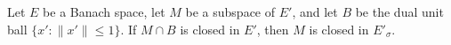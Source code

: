 Let $E$ be a Banach space, let $M$ be a subspace of $E'$, and let $B$ be the dual unit ball $\{x' : \|x'\| \leq 1\}$. If $M \cap B$ is closed in $E'$, then $M$ is closed in $E'_\sigma$.